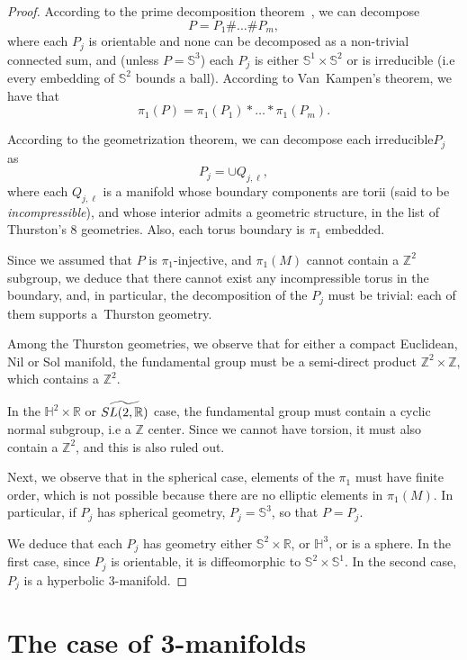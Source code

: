 \documentclass[10pt]{amsart}
\theoremstyle{definition}\newtheorem{defi}[theo]{Definition}\newtheorem{rema}[theo]{Remark}\newtheorem{exam}[theo]{Example}\newtheorem{exem}[theo]{Example}\newtheorem{nota}[theo]{Notation}
\newcommand{\R}{\mathbb{R}}
\newcommand{\Ss}{\mathbb{S}}
\newcommand{\Z}{\mathbb{Z}}
\newcommand{\Hh}{\mathbb{H}}
\theoremstyle{plain}
\let\oldtilde\tilde
\renewcommand*{\tilde}[1]{\mathchoice{\widetilde{#1}}{\widetilde{#1}}{\oldtilde{#1}}{\oldtilde{#1}}}
\begin{document}
\begin{proof}
According to the prime decomposition theorem~\cite{Milnor}, we can decompose
\[
P = P_1 \# \dots \# P_m,
\]
where each $P_j$ is orientable and none can be decomposed as a non-trivial connected sum, and (unless $P= \Ss^3$) each $P_j$ is either $\Ss^1\times\Ss^2$ or is irreducible (i.e every embedding of $\Ss^2$ bounds a ball). According to Van~Kampen's theorem, we have that
\[
\pi_1(P)= \pi_1(P_1)\ast \dots \ast \pi_1(P_m).
\]

According to the geometrization theorem, we can decompose each irreducible\linebreak $P_j$ as
\[
P_j = \cup Q_{j,\ell},
\]
where each $Q_{j,\ell}$ is a manifold whose boundary components are torii (said to be \emph{incompressible}), and whose interior admits a geometric structure, in the list of Thurston's 8 geometries. Also, each torus boundary is $\pi_1$ embedded.

Since we assumed that $P$ is $\pi_1$-injective, and $\pi_1(M)$ cannot contain a $\Z^2$ subgroup, we deduce that there cannot exist any incompressible torus in the boundary, and, in particular, the decomposition of the $P_j$ must be trivial: each of them supports a~Thurston geometry.

Among the Thurston geometries, we observe that for either a compact Euclidean, Nil or Sol manifold, the fundamental group must be a semi-direct product $\Z^2 \times \Z$, which contains a $\Z^2$.

In the $\Hh^2\times\R$ or $\tilde{SL(2,\R)}$ case, the fundamental group must contain a cyclic normal subgroup, i.e a $\Z$ center. Since we cannot have torsion, it must also contain a $\Z^2$, and this is also ruled out.

Next, we observe that in the spherical case, elements of the $\pi_1$ must have finite order, which is not possible because there are no elliptic elements in $\pi_1(M)$. In particular, if $P_j$ has spherical geometry, $P_j = \Ss^3$, so that $P=P_j$.


We deduce that each $P_j$ has geometry either $\Ss^2\times\R$, or $\Hh^3$, or is a sphere. In the first case, since $P_j$ is orientable, it is diffeomorphic to $\Ss^2 \times \Ss^1$. In the second case, $P_j$ is a hyperbolic $3$-manifold.
\end{proof}


\section{The case of 3-manifolds}\label{sec:3mfd}
\end{document}
